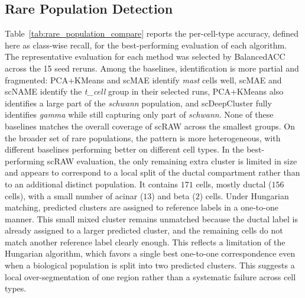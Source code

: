 \documentclass[11pt,a4paper]{article}
\begin{document}
\subsection{Rare Population Detection}

Table~\ref{tab:rare_population_compare} reports the per-cell-type accuracy, defined here as class-wise recall, for the best-performing evaluation of each algorithm. The representative evaluation for each method was selected by BalancedACC across the 15 seed reruns. Among the baselines, identification is more partial and fragmented: PCA+KMeans and scMAE identify \textit{mast} cells well, scMAE and scNAME identify the \textit{t\_cell} group in their selected runs, PCA+KMeans also identifies a large part of the \textit{schwann} population, and scDeepCluster fully identifies \textit{gamma} while still capturing only part of \textit{schwann}. None of these baselines matches the overall coverage of scRAW across the smallest groups. On the broader set of rare populations, the pattern is more heterogeneous, with different baselines performing better on different cell types. In the best-performing scRAW evaluation, the only remaining extra cluster is limited in size and appears to correspond to a local split of the ductal compartment rather than to an additional distinct population. It contains $171$ cells, mostly ductal ($156$ cells), with a small number of acinar ($13$) and beta ($2$) cells. Under Hungarian matching, predicted clusters are assigned to reference labels in a one-to-one manner. This small mixed cluster remains unmatched because the ductal label is already assigned to a larger predicted cluster, and the remaining cells do not match another reference label clearly enough. This reflects a limitation of the Hungarian algorithm, which favors a single best one-to-one correspondence even when a biological population is split into two predicted clusters. This suggests a local over-segmentation of one region rather than a systematic failure across cell types.
\end{document}

